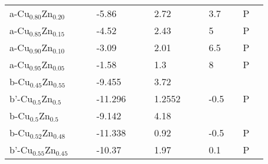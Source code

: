 \documentclass{article}
\begin{document}
\begin{center}
\begin{longtable}{|l|p{2.5cm}|l|p{2.5cm}|l|l|p{2.5cm}|l|l|p{2.5cm}|l|l|l|}
a-Cu$_{0.80}$Zn$_{0.20}$   &                            &     & -5.86               &     & \citep{KubaschewskiCatterallJohnAshley.1956}     & 2.72               &     & \citep{KubaschewskiCatterallJohnAshley.1956} & 3.7                                 &     & P   &  \\
a-Cu$_{0.85}$Zn$_{0.15}$   &                            &     & -4.52               &     & \citep{KubaschewskiCatterallJohnAshley.1956}     & 2.43               &     & \citep{KubaschewskiCatterallJohnAshley.1956} & 5                                   &     & P   &  \\
a-Cu$_{0.90}$Zn$_{0.10}$   &                            &     & -3.09               &     & \citep{KubaschewskiCatterallJohnAshley.1956}     & 2.01               &     & \citep{KubaschewskiCatterallJohnAshley.1956} & 6.5                                 &     & P   &  \\
a-Cu$_{0.95}$Zn$_{0.05}$   &                            &     & -1.58               &     & \citep{KubaschewskiCatterallJohnAshley.1956}     & 1.3                &     & \citep{KubaschewskiCatterallJohnAshley.1956} & 8                                   &     & P   &  \\
b-Cu$_{0.45}$Zn$_{0.55}$   &                            &     & -9.455              &     & \citep{KubaschewskiCatterallJohnAshley.1956}     & 3.72               &     & \citep{KubaschewskiCatterallJohnAshley.1956} &                                     &     &     &  \\
b'-Cu$_{0.5}$Zn$_{0.5} $   &                            &     & -11.296             &     & \citep{KubaschewskiCatterallJohnAshley.1956}     & 1.2552             &     & \citep{KubaschewskiCatterallJohnAshley.1956} & -0.5                               &     & P   &  \\
b-Cu$_{0.5}$Zn$_{0.5}$     &                            &     & -9.142              &     & \citep{KubaschewskiCatterallJohnAshley.1956}     & 4.18               &     & \citep{KubaschewskiCatterallJohnAshley.1956} &                                     &     &     &  \\
b-Cu$_{0.52}$Zn$_{0.48}$   &                            &     & -11.338             &     & \citep{KubaschewskiCatterallJohnAshley.1956}     & 0.92               &     & \citep{KubaschewskiCatterallJohnAshley.1956} & -0.5                               &     & P   &  \\
b'-Cu$_{0.55}$Zn$_{0.45}$  &                            &     & -10.37              &     & \citep{KubaschewskiCatterallJohnAshley.1956}     & 1.97               &     & \citep{KubaschewskiCatterallJohnAshley.1956} & 0.1                               &     & P   &  \\

\end{longtable}
\end{center}
\end{document}
